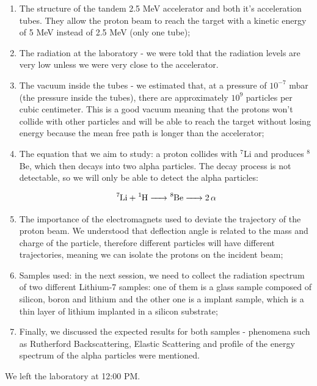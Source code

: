 \documentclass{article}
\begin{document}
\begin{enumerate}
  \item The structure of the tandem 2.5 MeV accelerator and both it's acceleration tubes. They allow the proton beam to reach the target with a kinetic energy of 5 MeV instead of 2.5 MeV (only one tube);
  \item The radiation at the laboratory - we were told that the radiation levels are very low unless we were very close to the accelerator.
  \item The vacuum inside the tubes - we estimated that, at a pressure of $10^{-7}$ mbar (the pressure inside the tubes), there are approximately $10^9$ particles per cubic centimeter. This is a good vacuum meaning that the protons won't collide with other particles and will be able to reach the target without losing energy because the mean free path is longer than the accelerator;
  \item The equation that we aim to study: a proton collides with $^7$Li and produces $^8$Be, which then decays into two alpha particles. The decay process is not detectable, so we will only be able to detect the alpha particles:
  
  \begin{equation}
    \ce{^7Li + ^1H -> ^8Be -> 2\alpha}
  \end{equation}
  
  \item The importance of the electromagnets used to deviate the trajectory of the proton beam. We understood that deflection angle is related to the mass and charge of the particle, therefore different particles will have different trajectories, meaning we can isolate the protons on the incident beam;
  \item Samples used: in the next session, we need to collect the radiation spectrum of two different Lithium-7 samples: one of them is a glass sample composed of silicon, boron and lithium and the other one is a implant sample, which is a thin layer of lithium implanted in a silicon substrate;
  \item Finally, we discussed the expected results for both samples - phenomena such as Rutherford Backscattering, Elastic Scattering and profile of the energy spectrum of the alpha particles were mentioned.
\end{enumerate}

We left the laboratory at 12:00 PM.

\end{document}
